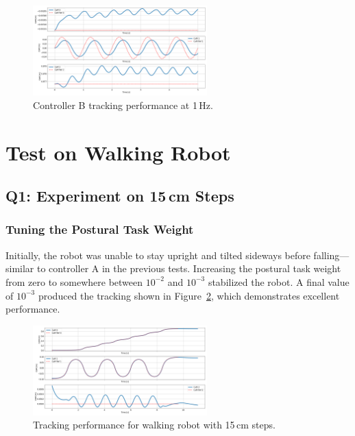 \documentclass[12pt]{article}
\begin{document}
\begin{figure}[h!]
\centering
\includegraphics[width=0.6\textwidth]{./images/3.3.2.png}
\caption{Controller B tracking performance at 1\,Hz.}
\label{fig:ctrlB}
\end{figure}

\section{Test on Walking Robot}

\subsection{Q1: Experiment on 15\,cm Steps}

\subsubsection{Tuning the Postural Task Weight}

Initially, the robot was unable to stay upright and tilted sideways before falling—similar to controller A in the previous tests.
Increasing the postural task weight from zero to somewhere between $10^{-2}$ and $10^{-3}$ stabilized the robot.
A final value of $10^{-3}$ produced the tracking shown in Figure~\ref{fig:walking15}, which demonstrates excellent performance.

\begin{figure}[h!]
\centering
\includegraphics[width=0.6\textwidth]{./images/4.1.png}
\caption{Tracking performance for walking robot with 15\,cm steps.}
\label{fig:walking15}
\end{figure}
\end{document}
